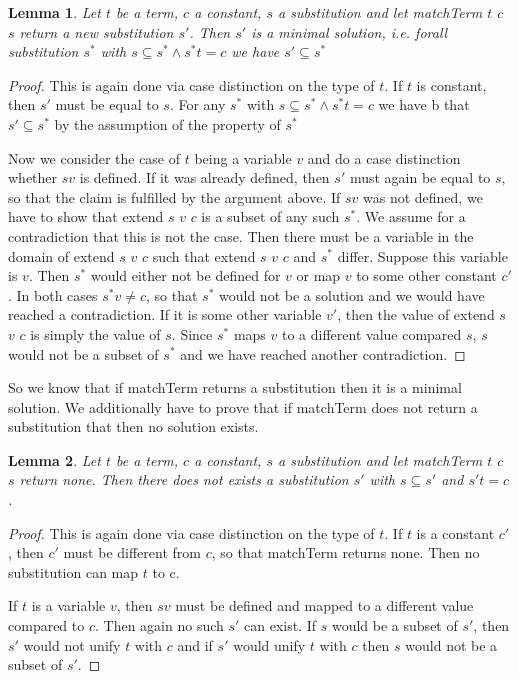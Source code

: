 \documentclass{article}
\newtheorem{lemma}{Lemma}
\begin{document}
        \begin{lemma}
        Let $t$ be a term, $c$ a constant, $s$ a substitution and let matchTerm $t$ $c$ $s$ return a new substitution $s'$. Then $s'$ is a minimal solution, i.e. forall substitution $s^\ast$ with $s \subseteq s^\ast \land s^\ast t = c$ we have $s' \subseteq s^\ast$
        \end{lemma}
        \begin{proof}
        This is again done via case distinction on the type of $t$. If $t$ is constant, then $s'$ must be equal to $s$. For any $s^\ast$ with $s \subseteq s^\ast \land s^\ast t = c$ we have b that $s' \subseteq s^\ast$ by the assumption of the property of $s^\ast$

        Now we consider the case of $t$ being a variable $v$ and do a case distinction whether $s v$ is defined. If it was already defined, then $s'$ must again be equal to $s$, so that the claim is fulfilled by the argument above.
        If $s v$ was not defined, we have to show that extend $s$ $v$ $c$ is a subset of any such $s^\ast$. We assume for a contradiction that this is not the case. Then there must be a variable in the domain of extend $s$ $v$ $c$ such that extend $s$ $v$ $c$ and $s^\ast$ differ. Suppose this variable is $v$. Then $s^\ast$ would either not be defined for $v$ or map $v$ to some other constant $c'$. In both cases $s^\ast v \neq c$, so that $s^\ast$ would not be a solution and we would have reached a contradiction.
        If it is some other variable $v'$, then the value of extend $s$ $v$ $c$ is simply the value of $s$. Since $s^\ast$ maps $v$ to a different value compared $s$, $s$ would not be a subset of $s^\ast$ and we have reached another contradiction.
        \end{proof}

        So we know that if matchTerm returns a substitution then it is a minimal solution. We additionally have to prove that if matchTerm does not return a substitution that then no solution exists.

        \begin{lemma}
        Let $t$ be a term, $c$ a constant, $s$ a substitution and let matchTerm $t$ $c$ $s$ return none. Then there does not exists a substitution $s'$ with $s \subseteq s'$ and $s' t = c$.
        \end{lemma}
        \begin{proof}
        This is again done via case distinction on the type of $t$. If $t$ is a constant $c'$, then $c'$ must be different from $c$, so that matchTerm returns none. Then no substitution can map $t$ to c.

        If $t$ is a variable $v$, then $s v$ must be defined and mapped to a different value compared to $c$. Then again no such $s'$ can exist. If $s$ would be a subset of $s'$, then $s'$ would not unify $t$ with $c$ and if $s'$ would unify $t$ with $c$ then $s$ would not be a subset of $s'$.
        \end{proof}
\end{document}
